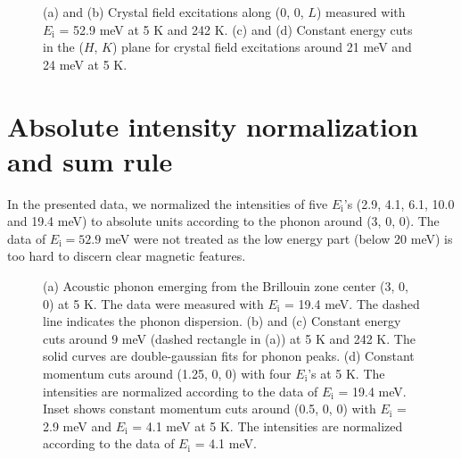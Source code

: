 \documentclass[%
reprint,
superscriptaddress,
amsmath,amssymb,
aps,
prb,
]{revtex4-2}
\begin{document}
	\begin{figure}[t!]
		\caption{(a) and (b) Crystal field excitations along (0, 0, $L$) measured with $E_\mathrm{i}$ = 52.9 meV at 5 K and 242 K. (c) and (d) Constant energy cuts in the ($H$, $K$) plane for crystal field excitations around 21 meV and 24 meV at 5 K.}
		\label{figs1}
	\end{figure}
	
	\section{Absolute intensity normalization and sum rule}
	
	In the presented data, we normalized the intensities of five $E_\mathrm{i}$'s (2.9, 4.1, 6.1, 10.0 and 19.4 meV) to absolute units according to the phonon around (3, 0, 0). The data of $E_\mathrm{i} = 52.9$ meV were not treated as the low energy part (below 20 meV) is too hard to discern clear magnetic features.
	
	\begin{figure}[t!]
		\caption{(a) Acoustic phonon emerging from the Brillouin zone center (3, 0, 0) at 5 K. The data were measured with $E_\mathrm{i}$ = 19.4 meV. The dashed line indicates the phonon dispersion. (b) and (c) Constant energy cuts around 9 meV (dashed rectangle in (a)) at 5 K and 242 K. The solid curves are double-gaussian fits for phonon peaks. (d) Constant momentum cuts around (1.25, 0, 0) with four $E_\mathrm{i}$'s at 5 K. The intensities are normalized according to the data of $E_\mathrm{i}$ = 19.4 meV. Inset shows constant momentum cuts around (0.5, 0, 0) with $E_\mathrm{i}$ = 2.9 meV and $E_\mathrm{i}$ = 4.1 meV at 5 K. The intensities are normalized according to the data of $E_\mathrm{i}$ = 4.1 meV.}
		\label{figs2}
	\end{figure}
	
\end{document}
